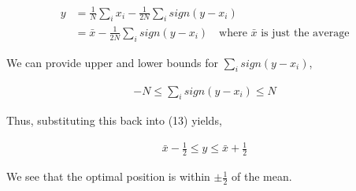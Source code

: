 \documentclass{article}
\begin{document}
\begin{align}
    y & = \frac{1}{N}\sum_{i} x_i - \frac{1}{2N} \sum_{i} sign(y - x_i)                                             \\
      & = \bar{x} - \frac{1}{2N} \sum_{i} sign(y - x_i) \quad \textrm{where } \bar{x} \textrm{ is just the average}
\end{align}

We can provide upper and lower bounds for \(\sum_{i} sign(y - x_i)\),

\begin{align}
    -N \leq \sum_{i} sign(y - x_i) \leq N
\end{align}

Thus, substituting this back into (13) yields,

\begin{align}
    \bar{x} - \frac{1}{2} \leq y \leq \bar{x} + \frac{1}{2}
\end{align}

We see that the optimal position is within \(\pm \frac{1}{2}\) of the mean.
\end{document}
